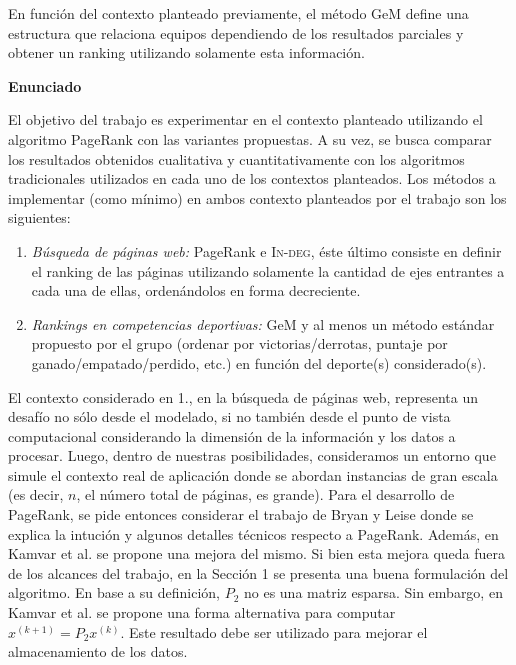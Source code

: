 \documentclass[11pt, a4paper]{article}
\begin{document}
En funci\'on del contexto planteado previamente, el m\'etodo GeM define una estructura que relaciona equipos dependiendo de los resultados parciales y
obtener un ranking utilizando solamente esta informaci\'on.

\vskip 5pt
\noindent\textbf{Enunciado}
\vskip 5pt

El objetivo del trabajo es experimentar en el contexto planteado utilizando el algoritmo PageRank con las variantes propuestas. A su vez, se busca
comparar los resultados obtenidos cualitativa y cuantitativamente con los algoritmos tradicionales utilizados en cada uno de los contextos planteados. 
Los m\'etodos a implementar (como m\'inimo) en ambos contexto planteados por el trabajo son los siguientes:

\begin{enumerate}
\item \emph{B\'usqueda de p\'aginas web:} PageRank e \textsc{In-deg}, \'este \'ultimo consiste en definir el ranking de las p\'aginas utilizando 
solamente la cantidad de ejes entrantes a cada una de ellas, orden\'andolos en forma decreciente.
\item \emph{Rankings en competencias deportivas:} GeM y al menos un m\'etodo est\'andar propuesto por el grupo (ordenar por victorias/derrotas,
puntaje por ganado/empatado/perdido, etc.) en funci\'on del deporte(s) considerado(s).
\end{enumerate}

El contexto considerado en 1., en la b\'usqueda de p\'aginas web, representa un desaf\'io no s\'olo desde el modelado, si no tambi\'en desde el punto 
de vista computacional considerando la dimensi\'on de la informaci\'on y los datos a procesar. Luego, dentro de nuestras posibilidades, consideramos
un entorno que simule el contexto real de aplicaci\'on donde se abordan  instancias de gran escala (es decir, $n$, el n\'umero total de p\'aginas, es 
grande). Para el desarrollo de PageRank, se pide entonces considerar el trabajo de Bryan y Leise \cite{Bryan2006} donde se explica la intuci\'on y algunos 
detalles t\'ecnicos respecto a PageRank. Adem\'as, en Kamvar et al. \cite{Kamvar2003} se propone una mejora del mismo. Si bien esta mejora queda fuera de 
los alcances del trabajo, en la Secci\'on 1 se presenta una buena formulaci\'on del algoritmo. En base a su definici\'on, $P_2$ no es una matriz esparsa. 
Sin embargo, en Kamvar et al. \cite[Algoritmo 1]{Kamvar2003} se propone una forma alternativa para computar $x^{(k+1)} = P_2 x^{(k)}$. Este resultado debe 
ser utilizado para mejorar el almacenamiento de los datos.
\end{document}
